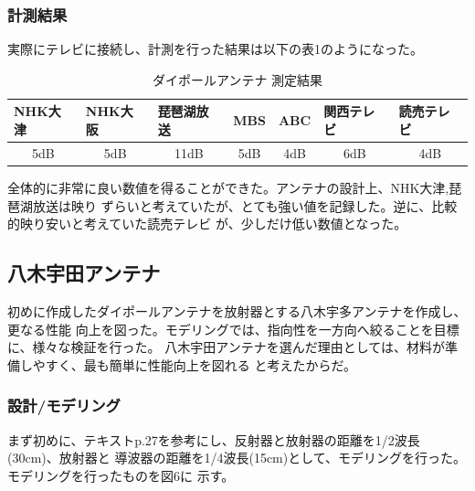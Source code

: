 \documentclass[dvipdfmx,autodetect-engine,titlepage]{jsarticle}
\begin{document}
\subsubsection*{計測結果}
実際にテレビに接続し、計測を行った結果は以下の表1のようになった。

\begin{table}[h]
  \centering
  \caption{ダイポールアンテナ 測定結果}
  \begin{tabular}{|l|l|l|l|l|l|l|}
  \hline
  NHK大津                     & NHK大阪                    & 琵琶湖放送                     & MBS                      & ABC                      & 関西テレビ                    & 読売テレビ                    \\ \hline\hline
  \multicolumn{1}{|c|}{5dB} & \multicolumn{1}{c|}{5dB} & \multicolumn{1}{c|}{11dB} & \multicolumn{1}{c|}{5dB} & \multicolumn{1}{c|}{4dB} & \multicolumn{1}{c|}{6dB} & \multicolumn{1}{c|}{4dB} \\ \hline
  \end{tabular}
  \end{table}

全体的に非常に良い数値を得ることができた。アンテナの設計上、NHK大津,琵琶湖放送は映り
ずらいと考えていたが、とても強い値を記録した。逆に、比較的映り安いと考えていた読売テレビ
が、少しだけ低い数値となった。

\subsection*{八木宇田アンテナ}
初めに作成したダイポールアンテナを放射器とする八木宇多アンテナを作成し、更なる性能
向上を図った。モデリングでは、指向性を一方向へ絞ることを目標に、様々な検証を行った。
八木宇田アンテナを選んだ理由としては、材料が準備しやすく、最も簡単に性能向上を図れる
と考えたからだ。

\subsubsection*{設計/モデリング}

まず初めに、テキストp.27を参考にし、反射器と放射器の距離を1/2波長(30cm)、放射器と
導波器の距離を1/4波長(15cm)として、モデリングを行った。モデリングを行ったものを図6に
示す。
\end{document}

